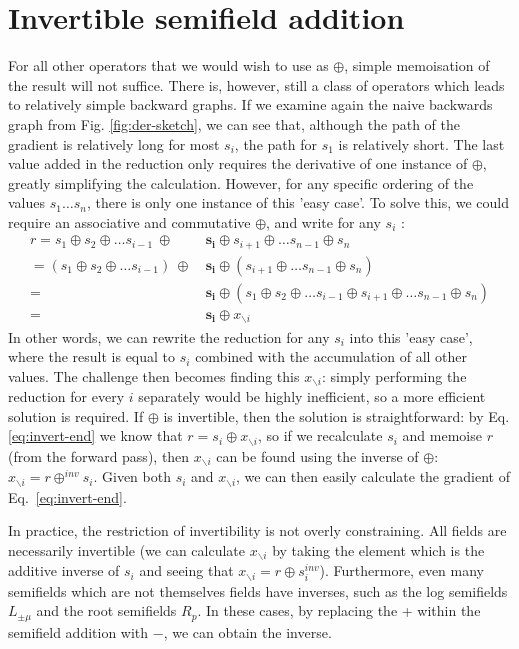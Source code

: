\documentclass[a4paper, 12pt, openright]{report}
\begin{document}
\section{Invertible semifield addition}
\label{sec:invert-derive}
For all other operators that we would wish to use as $\oplus$, simple memoisation of the result will not suffice. There is, however, still a class of operators which leads to relatively simple backward graphs. If we examine again the naive backwards graph from Fig. \ref{fig:der-sketch}, we can see that, although the path of the gradient is relatively long for most $s_i$, the path for $s_1$ is relatively short. The last value added in the reduction only requires the derivative of one instance of $\oplus$, greatly simplifying the calculation. However, for any specific ordering of the values $s_1\ldots s_n$, there is only one instance of this 'easy case'. To solve this, we could require an associative and commutative $\oplus$, and write for any $s_i$ \cite{ppad}:
\begin{align}
	r= s_1\oplus s_2 \oplus \ldots s_{i-1}\ \oplus\ &\mathbf{s_i} \oplus s_{i+1} \oplus \ldots s_{n-1} \oplus s_n \label{eq:invert-start}\\
	 =(s_1\oplus s_2 \oplus \ldots s_{i-1})\ \oplus\ &\mathbf{s_i} \oplus (s_{i+1} \oplus \ldots s_{n-1} \oplus s_n)\\
	  =\;&\mathbf{s_i} \oplus (s_1\oplus s_2 \oplus \ldots s_{i-1} \oplus s_{i+1} \oplus \ldots s_{n-1} \oplus s_n)\\
	  =\;&\mathbf{s_i} \oplus x_{\backslash i} \label{eq:invert-end}
\end{align}
In other words, we can rewrite the reduction for any $s_i$ into this 'easy case', where the result is equal to $s_i$ combined with the accumulation of all other values. The challenge then becomes finding this $x_{\backslash i}$: simply performing the reduction for every $i$ separately would be highly inefficient, so a more efficient solution is required. If $\oplus$ is invertible, then the solution is straightforward: by Eq. \ref{eq:invert-end} we know that $r=s_i \oplus x_{\backslash i}$, so if we recalculate $s_i$ and memoise $r$ (from the forward pass), then $x_{\backslash i}$ can be found using the inverse of $\oplus$: $x_{\backslash i}=r\oplus^{inv}s_i$. Given both $s_i$ and  $x_{\backslash i}$, we can then easily calculate the gradient of Eq.\ \ref{eq:invert-end}.

In practice, the restriction of invertibility is not overly constraining. All fields are necessarily invertible (we can calculate $x_{\backslash i}$ by taking the element which is the additive inverse of $s_i$ and seeing that $x_{\backslash i}=r\oplus s_i^{inv}$). Furthermore, even many semifields which are not themselves fields have inverses, such as the log semifields $L_{\pm\mu}$ and the root semifields $R_p$. In these cases, by replacing the + within the semifield addition with $-$, we can obtain the inverse.
\end{document}
